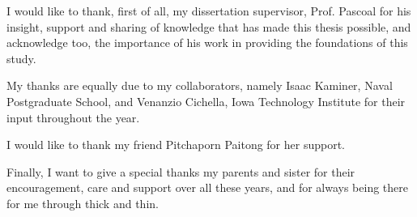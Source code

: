 
\par I would like to thank, first of all, my dissertation supervisor, Prof. Pascoal for his insight, support and sharing of knowledge that has made this thesis possible, and acknowledge too, the importance of his work in providing the foundations of this study.
\par My thanks are equally due to my collaborators, namely Isaac Kaminer, Naval Postgraduate School, and Venanzio Cichella, Iowa Technology Institute for their input throughout the year.
\par I would like to thank my friend Pitchaporn Paitong for her support.
\par Finally, I want to give a special thanks my parents and sister for their encouragement, care and support over all these years, and for always being there for me through thick and thin.

